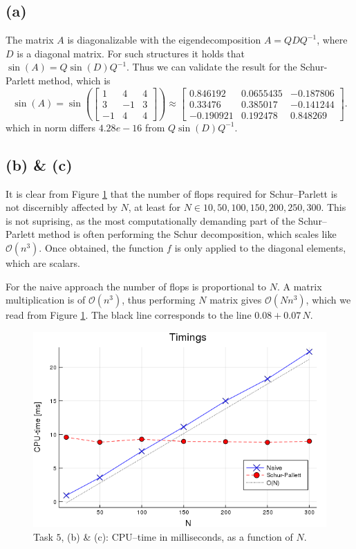 \subsection*{(a)}

The matrix $A$ is diagonalizable with the  eigendecomposition $A = QDQ^{-1}$, where $D$ is a diagonal matrix. For such structures it holds that $\sin(A) = Q\sin(D)Q^{-1}$. Thus we can validate the result for the Schur-Parlett method, which is
\begin{equation}
  \sin(A) = \sin\left(\begin{bmatrix}
    1 & 4 & 4\\
    3 & -1 & 3\\
    -1 & 4 & 4
  \end{bmatrix}\right) \approx  \begin{bmatrix}
  0.846192 & 0.0655435 & -0.187806\\
 0.33476  & 0.385017  & -0.141244\\
-0.190921 & 0.192478  &  0.848269
  \end{bmatrix}.
\end{equation}
which in norm differs $4.28e-16$ from $Q\sin(D)Q^{-1}$.


%

%

\subsection*{(b) \& (c)}

It is clear from Figure \ref{fig:task5bc} that the number of flops required for Schur--Parlett is not discernibly affected by $N$, at least for $N \in {10,50,100,150,200,250,300}$. This is not suprising, as the most computationally demanding part of the Schur--Parlett method is often performing the Schur decomposition, which scales like $\mathcal{O}(n^{3})$. Once obtained, the function $f$ is only applied to the diagonal elements, which are scalars.

For the naive approach  the number of flops is proportional to $N$. A matrix multiplication is of $\mathcal{O}(n^{3})$, thus performing $N$ matrix gives $\mathcal{O}(Nn^{3})$, which we read from Figure \ref{fig:task5bc}. The black line corresponds to the line $0.08 + 0.07\,N$.


\begin{figure}
\centering
\includegraphics[scale=0.6]{Task5bc}
\caption{Task $5$, (b) \& (c):  CPU--time in milliseconds, as a function of $N$.}
\label{fig:task5bc}
\end{figure}

